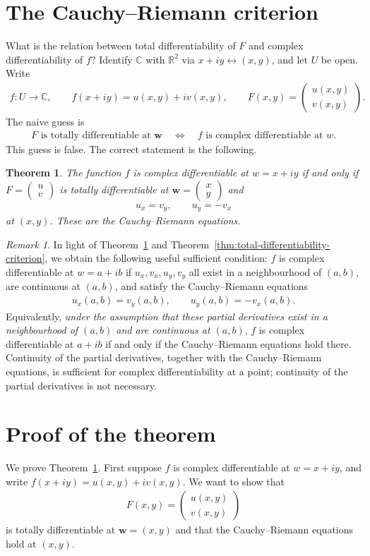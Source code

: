 \documentclass[11pt]{article}
\theoremstyle{plain}
\newtheorem{theorem}{Theorem}[section]
\theoremstyle{definition}
\theoremstyle{remark}
\newtheorem*{remark}{Remark}
\numberwithin{equation}{section}
\newcommand{\be}{\begin{eqnarray}}
\newcommand{\ee}{\end{eqnarray}}
\newcommand{\C}{\mathbb{C}}
\newcommand{\R}{\mathbb{R}}
\newcommand{\ww}{\mathbf w}
\begin{document}
\section{The Cauchy--Riemann criterion}
What is the relation between total differentiability of $F$ and complex
differentiability of $f$? Identify $\C$ with $\R^2$ via
$x+iy\leftrightarrow(x,y)$, and let $U$ be open. Write
\be
 f:U\to\C,\qquad f(x+iy)=u(x,y)+iv(x,y),\qquad
 F(x,y)=\begin{pmatrix}u(x,y)\\v(x,y)\end{pmatrix}.
\ee
The naive guess is
\be
 F\text{ is totally differentiable at }\ww
 \quad\Longleftrightarrow\quad
 f\text{ is complex differentiable at }w.
\ee
This guess is false. The correct statement is the following.
\begin{theorem}
\label{thm:complex-differentiability-cr}
The function $f$ is complex differentiable at $w=x+iy$ if and only if
$F=\begin{pmatrix}u\\v\end{pmatrix}$ is totally differentiable at
$\ww=\begin{pmatrix}x\\y\end{pmatrix}$ and
\be
 \boxed{u_x=v_y,\qquad u_y=-v_x}
\ee
at $(x,y)$. These are the \emph{Cauchy--Riemann equations}.
\end{theorem}

\begin{remark}
In light of Theorem~\ref{thm:complex-differentiability-cr} and
Theorem~\ref{thm:total-differentiability-criterion}, we obtain the following
useful sufficient condition: $f$ is complex differentiable at $w=a+ib$
if $u_x,v_x,u_y,v_y$ all exist in a neighbourhood of $(a,b)$, are
continuous at $(a,b)$, and satisfy the Cauchy--Riemann equations
\be
 u_x(a,b)=v_y(a,b),\qquad u_y(a,b)=-v_x(a,b).
\ee
Equivalently, \emph{under the assumption that these partial derivatives
exist in a neighbourhood of $(a,b)$ and are continuous at $(a,b)$},
$f$ is complex differentiable at $a+ib$ if and only if the
Cauchy--Riemann equations hold there. Continuity of the partial derivatives,
together with the Cauchy--Riemann equations, is sufficient for complex
differentiability at a point; continuity of the partial derivatives is
not necessary.
\end{remark}

\section{Proof of the theorem}
We prove Theorem~\ref{thm:complex-differentiability-cr}. First suppose $f$ is complex differentiable at $w=x+iy$, and write
$f(x+iy)=u(x,y)+iv(x,y)$. We want to show that
\be
 F(x,y)=\begin{pmatrix}u(x,y)\\v(x,y)\end{pmatrix}
\ee
is totally differentiable at $\ww=(x,y)$ and that the Cauchy--Riemann
equations hold at $(x,y)$.
\end{document}

